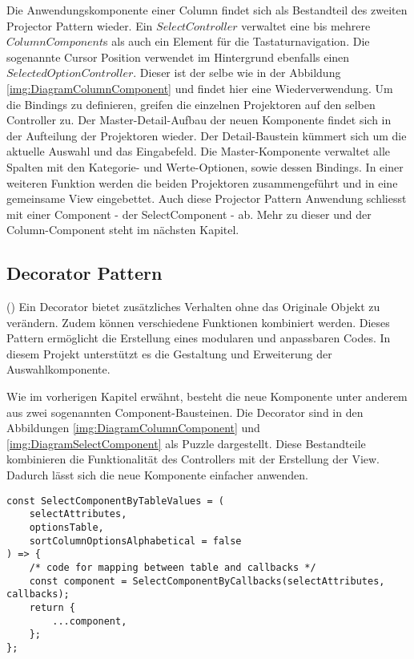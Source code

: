 Die Anwendungskomponente einer Column findet sich als Bestandteil des zweiten Projector Pattern wieder.
Ein $SelectController$ verwaltet eine bis mehrere $ColumnComponent$s als auch ein Element für die Tastaturnavigation.
Die sogenannte Cursor Position verwendet im Hintergrund ebenfalls einen $SelectedOptionController$. 
Dieser ist der selbe wie in der Abbildung \ref{img:DiagramColumnComponent} und findet hier eine Wiederverwendung.
Um die Bindings zu definieren, greifen die einzelnen Projektoren auf den selben Controller zu.
Der Master-Detail-Aufbau der neuen Komponente findet sich in der Aufteilung der Projektoren wieder.
Der Detail-Baustein kümmert sich um die aktuelle Auswahl und das Eingabefeld.
Die Master-Komponente verwaltet alle Spalten mit den Kategorie- und Werte-Optionen, sowie dessen Bindings.
In einer weiteren Funktion werden die beiden Projektoren zusammengeführt und in eine gemeinsame View eingebettet.
Auch diese Projector Pattern Anwendung schliesst mit einer Component - der SelectComponent - ab.
Mehr zu dieser und der Column-Component steht im nächsten Kapitel.


\subsection{Decorator Pattern}

(\cite{decoratorPattern}) Ein Decorator bietet zusätzliches Verhalten ohne das Originale Objekt zu verändern.
Zudem können verschiedene Funktionen kombiniert werden.
Dieses Pattern ermöglicht die Erstellung eines modularen und anpassbaren Codes.
In diesem Projekt unterstützt es die Gestaltung und Erweiterung der Auswahlkomponente.

Wie im vorherigen Kapitel erwähnt, besteht die neue Komponente unter anderem aus zwei sogenannten Component-Bausteinen.
Die Decorator sind in den Abbildungen \ref{img:DiagramColumnComponent} und \ref{img:DiagramSelectComponent} als Puzzle dargestellt.
Diese Bestandteile kombinieren die Funktionalität des Controllers mit der Erstellung der View.
Dadurch lässt sich die neue Komponente einfacher anwenden.

\begin{lstlisting}[style = htmlcssjs, caption = SelectComponentByTableValue dekoriert SelectComponentByCallback, label = code:componentDecorator]
const SelectComponentByTableValues = (
    selectAttributes,
    optionsTable,
    sortColumnOptionsAlphabetical = false
) => {
    /* code for mapping between table and callbacks */
    const component = SelectComponentByCallbacks(selectAttributes, callbacks);
    return {
        ...component,
    };
};
\end{lstlisting}

